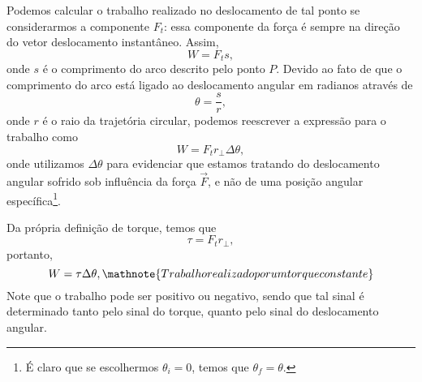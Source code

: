 Podemos calcular o trabalho realizado no deslocamento de tal ponto se considerarmos a componente $F_t$: essa componente da força é sempre na direção do vetor deslocamento instantâneo. Assim,
\begin{equation}
    W = F_t s,
\end{equation}
%
onde $s$ é o comprimento do arco descrito pelo ponto $P$. Devido ao fato de que o comprimento do arco está ligado ao deslocamento angular em radianos através de
\begin{equation}
    \theta = \frac{s}{r},
\end{equation}
%
onde $r$ é o raio da trajetória circular, podemos reescrever a expressão para o trabalho como
\begin{equation}
    W = F_t r_\perp \Delta\theta,
\end{equation}
%
onde utilizamos $\Delta \theta$ para evidenciar que estamos tratando do deslocamento angular sofrido sob influência da força $\vec{F}$, e não de uma posição angular específica\footnote{É claro que se escolhermos $\theta_i = 0$, temos que $\theta_f = \theta$.}.

Da própria definição de torque, temos que
\begin{equation}
    \tau = F_t r_\perp,
\end{equation}
%
portanto,
\begin{equation}\label{Eq:TrabalhoTorqueConstante}
    W = \tau \Delta\theta, \mathnote{Trabalho realizado por um torque constante}
\end{equation}
%
Note que o trabalho pode ser positivo ou negativo, sendo que tal sinal é determinado tanto pelo sinal do torque, quanto pelo sinal do deslocamento angular.

